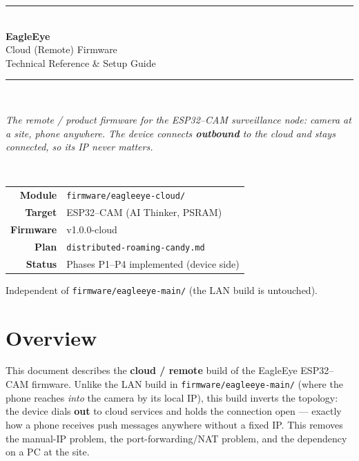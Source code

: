 \documentclass[11pt,a4paper]{article}
\newcommand{\code}[1]{\texttt{#1}}
\begin{document}
\begin{titlepage}
\centering
\vspace*{2.2cm}
{\color{eagleblue}\rule{\linewidth}{1.4pt}}\\[0.5cm]
{\Huge\bfseries\color{eagleblue} EagleEye}\\[0.35cm]
{\LARGE Cloud (Remote) Firmware}\\[0.25cm]
{\large\color{eaglegray} Technical Reference \& Setup Guide}\\[0.4cm]
{\color{eagleblue}\rule{\linewidth}{1.4pt}}\\[1.2cm]

\begin{minipage}{0.85\linewidth}
\centering\itshape\color{eaglegray}
The remote / product firmware for the ESP32--CAM surveillance node:
\textit{camera at a site, phone anywhere}. The device connects \textbf{outbound}
to the cloud and stays connected, so its IP never matters.
\end{minipage}\\[1.6cm]

\begin{tabular}{rl}
\textbf{Module}      & \code{firmware/eagleeye-cloud/} \\[2pt]
\textbf{Target}      & ESP32--CAM (AI Thinker, PSRAM) \\[2pt]
\textbf{Firmware}    & v1.0.0-cloud \\[2pt]
\textbf{Plan}        & \code{distributed-roaming-candy.md} \\[2pt]
\textbf{Status}      & Phases P1--P4 implemented (device side) \\
\end{tabular}

\vfill
{\color{eaglegray}\small Independent of \code{firmware/eagleeye-main/} (the LAN build is untouched).}
\end{titlepage}

\tableofcontents
\newpage

\section{Overview}
This document describes the \textbf{cloud / remote} build of the EagleEye ESP32--CAM
firmware. Unlike the LAN build in \code{firmware/eagleeye-main/} (where the phone reaches
\emph{into} the camera by its local IP), this build inverts the topology: the device dials
\textbf{out} to cloud services and holds the connection open --- exactly how a phone receives
push messages anywhere without a fixed IP. This removes the manual-IP problem, the
port-forwarding/NAT problem, and the dependency on a PC at the site.
\end{document}
